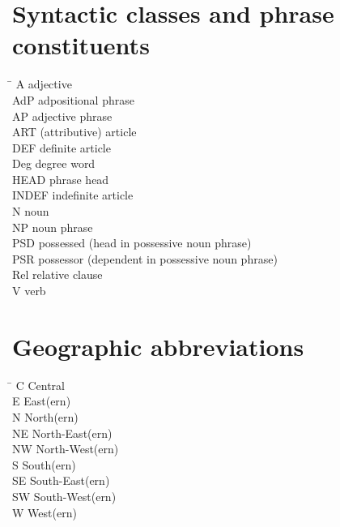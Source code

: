 \section*{Syntactic classes and phrase constituents}

\begin{tabbing}
\TABh \= \kill
{A} \> adjective\\
{AdP} \> adpositional phrase\\
{AP} \> adjective phrase\\
{ART} \> (attributive) article\\
{DEF} \> definite article\\
{Deg} \> degree word\\
{HEAD} \> phrase head\\
{INDEF} \> indefinite article\\
{N} \> noun\\
{NP} \> noun phrase\\
{PSD} \> possessed (head in possessive noun phrase)\\ 
{PSR} \> possessor (dependent in possessive noun phrase)\\
{Rel} \> relative clause\\
{V} \> verb\\
\end{tabbing}

\section*{Geographic abbreviations}


\begin{multicols}{2}
\begin{tabbing}
\TABh \= \kill
{C} \> Central\\
{E} \> East(ern)\\
{N} \> North(ern)\\
{NE} \> North-East(ern)\\
{NW} \> North-West(ern)\\
{S} \> South(ern)\\
{SE} \> South-East(ern)\\
{SW} \> South-West(ern)\\
{W} \> West(ern)\\
\end{tabbing}
\end{multicols}

